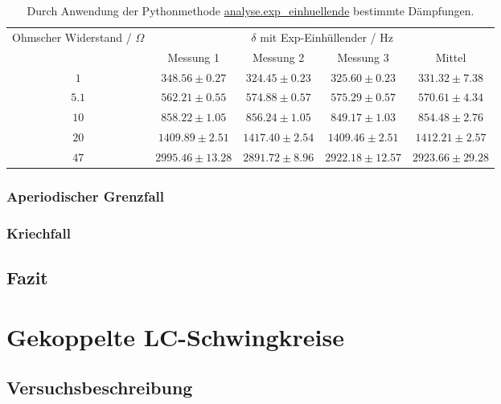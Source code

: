 \documentclass[a4paper, 12pt]{scrartcl}
\begin{document}
\begin{table}[H]
\centering
\begin{adjustbox}{width=\textwidth}
\begin{tabular}{c|cccc}
\multirow{2}{*}{Ohmscher Widerstand / $\Omega$} & \multicolumn{4}{c}{$\delta$ mit Exp-Einhüllender / Hz} \\
\cline{2-5}
& Messung 1 & Messung 2 & Messung 3 & Mittel\\
\hline
$1$ & $348.56 \pm 0.27$ & $324.45\pm 0.23$ & $325.60\pm 0.23$ & $331.32\pm 7.38$ \\
$5.1$ & $562.21 \pm 0.55$ & $574.88\pm 0.57$ & $575.29\pm 0.57$ & $570.61\pm 4.34$ \\
$10$ & $858.22 \pm 1.05$ & $856.24\pm 1.05$ & $849.17\pm 1.03$ & $854.48\pm 2.76$ \\
$20$ & $1409.89 \pm 2.51$ & $1417.40\pm 2.54$ & $1409.46\pm 2.51$ & $1412.21\pm 2.57$ \\
$47$ & $2995.46 \pm 13.28$ & $2891.72\pm 8.96$ & $2922.18\pm 12.57$ & $2923.66\pm 29.28$
\end{tabular}
\end{adjustbox}
\caption{Durch Anwendung der Pythonmethode \url{analyse.exp_einhuellende} bestimmte Dämpfungen.}
\label{tab:daempfung2}
\end{table}



\subsubsection{Aperiodischer Grenzfall}

\subsubsection{Kriechfall}



\subsection{Fazit}




\section{Gekoppelte LC-Schwingkreise}


\subsection{Versuchsbeschreibung}
\end{document}
